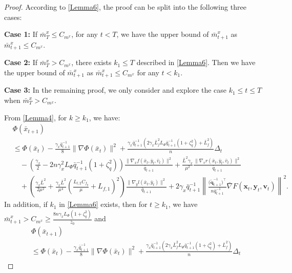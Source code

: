 \documentclass{article}
\theoremstyle{plain}
\theoremstyle{definition}
\theoremstyle{remark}
\begin{document}
\begin{proof}
According to \cref{Lemma6}, the proof can be split into the following three cases:

\textbf{Case 1:} If $\bar{m}^x_T \leq C_{m^x}$, for any $t < T$, we have the upper bound of $\bar{m}^x_{t+1}$ as $\bar{m}^x_{t+1} \leq C_{m^x}$.

\textbf{Case 2:} If $\bar{m}^x_T > C_{m^x}$, there exists $k_1 \leq T$ described in \cref{Lemma6}. Then we have the upper bound of $\bar{m}^x_{t+1}$ as $\bar{m}^x_{t+1} \leq C_{m^x}$ for any $t < k_1$.

\textbf{Case 3:} In the remaining proof, we only consider and explore the case $k_1 \leq t \leq T$ when $\bar{m}^x_T > C_{m^x}$.

From \cref{Lemma4}, for $k \geq k_1$, we have:
\begin{align}
&\Phi(\bar{x}_{t+1})\nonumber\\
&\leq\Phi(\bar{x}_t)-\frac{\gamma_x \bar{q}_{t+1}^{-1}}{8}\|\nabla \Phi(\bar{x}_t)\|^2+\frac{\gamma_x\bar{q}_{t+1}^{-1}(2\gamma_x \bar{L}_{f}^2L_\Phi \bar{q}_{t+1}^{-1} \left(1 +\zeta_q^2\right)+\bar{L}_{f}^2)}{n} \Delta_t\nonumber\\
&\quad -\left(\frac{\gamma_x}{2}-{2n\gamma_x^2 L_\Phi \bar{q}_{t+1}^{-1} \left(1 +\zeta_q^2\right)}\right)\frac{\|\nabla_x f(\bar{x}_t, \bar{y}_t, \bar{v}_t)\|^2}{\bar{q}_{t+1}}
+ \frac{\bar{L}^2\gamma_x }{\mu^2} \frac{\|\nabla_v r(\bar{x}_t, \bar{y}_t, \bar{v}_t)\|^2}{\bar{q}_{t+1}} \nonumber \\
&\quad +\!\left(\! \frac{\gamma_x\bar{L}^2}{2\mu^2} \!+\! \frac{\gamma_x\bar{L}^2}{\mu^4}\!\! \left(\! \frac{L_{l,2} C_{f_y}}{\mu} \!+\! L_{f,1} \!\right)^2 \right) \frac{\|\nabla_y l(\bar{x}_t, \bar{y}_t)\|^2}{\bar{q}_{t+1}}\!+\! 2\gamma_x \bar{q}_{t+1}^{-1}  \left\| \frac{\big(\tilde{\mathbf{q}}_{t+1}^{-1}\big)^\top}{n\bar{q}_{t+1}^{-1}} \bar{\nabla} F(\mathbf{x}_t, \mathbf{y}_t, \mathbf{v}_t) \right\|^2\!\!.\label{eq129}
\end{align}
In addition, if $k_1$ in \cref{Lemma6} exists, then for $t \geq k_1$, we have $\bar{m}^x_{t+1} > C_{m^x} \geq \frac{8n\gamma_x L_\Phi \left(1 +\zeta_q^2\right)}{\bar{z}_0}$ and 
\begin{align}
&\Phi(\bar{x}_{t+1})\nonumber\\
&\leq\Phi(\bar{x}_t)-\frac{\gamma_x \bar{q}_{t+1}^{-1}}{8}\|\nabla \Phi(\bar{x}_t)\|^2+\frac{\gamma_x\bar{q}_{t+1}^{-1}(2\gamma_x \bar{L}_{f}^2L_\Phi \bar{q}_{t+1}^{-1} \left(1 +\zeta_q^2\right)+\bar{L}_{f}^2)}{n} \Delta_t\nonumber\\

\end{align}
\end{proof}
\end{document}
